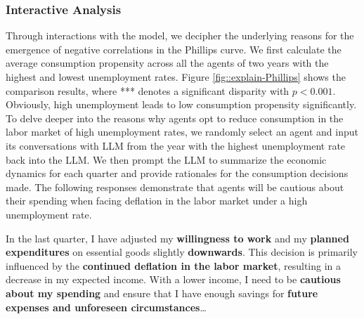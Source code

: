 \subsubsection{Interactive Analysis}
Through interactions with the model, we decipher the underlying reasons for the emergence of negative correlations in the Phillips curve. We first calculate the average consumption propensity across all the agents of two years with the highest and lowest unemployment rates. Figure \ref{fig::explain-Phillips} shows the comparison results, where *** denotes a significant disparity with $p<0.001$. Obviously, high unemployment leads to low consumption propensity significantly. To delve deeper into the reasons why agents opt to reduce consumption in the labor market of high unemployment rates, we randomly select an agent and input its conversations with LLM from the year with the highest unemployment rate back into the LLM. We then prompt the LLM to summarize the economic dynamics for each quarter and provide rationales for the consumption decisions made. The following responses demonstrate that agents will be cautious about their spending when facing deflation in the labor market under a high unemployment rate.

\begin{center}
\begin{minipage}{0.92\linewidth}
\begin{shaded}
In the last quarter, I have adjusted my \textbf{willingness to work} and my \textbf{planned expenditures} on essential goods slightly \textbf{downwards}. This decision is primarily influenced by the \textbf{continued deflation in the labor market}, resulting in a decrease in my expected income. With a lower income, I need to be \textbf{cautious about my spending} and ensure that I have enough savings for \textbf{future expenses and unforeseen circumstances}\ldots
\end{shaded}
\end{minipage}
\end{center}

